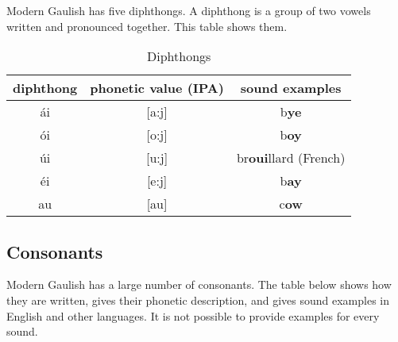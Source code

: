 \noindent Modern Gaulish has five diphthongs. A diphthong is a group of two vowels written and pronounced together. This table shows them.

\begin{table}[H]
\begin{center}
\begin{tabu}{c|c|c}
  \toprule
  diphthong & phonetic value (IPA) & sound examples\\
  \toprule
  \'{a}i & [a:j] & b\textbf{ye}\\
  \'{o}i & [o:j] & b\textbf{oy}\\
  \'{u}i & [u:j] & br\textbf{oui}llard (French)\\
  \'{e}i & [e:j] & b\textbf{ay}\\
  au & [au] & c\textbf{ow}\\
  \bottomrule
\end{tabu}
\end{center}
\caption{Diphthongs}
\label{phonology_diphthongs}
\end{table}

\subsection{Consonants}

\noindent Modern Gaulish has a large number of consonants. The table below shows how they are written, gives their phonetic description, and gives sound examples in English and other languages. It is not possible to provide examples for every sound.


